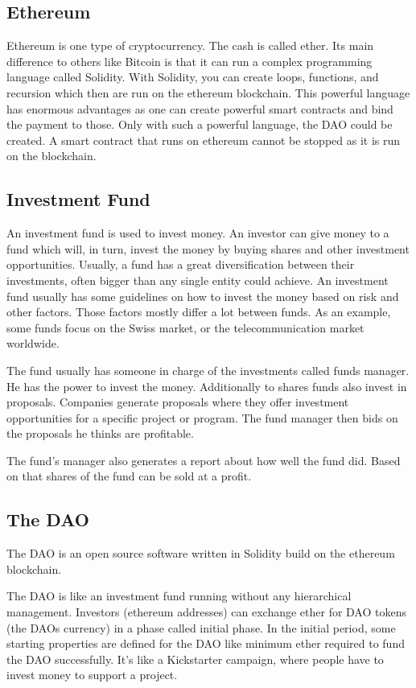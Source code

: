 \documentclass[a4paper, 11pt]{scrartcl}
\begin{document}
\subsection{Ethereum}

Ethereum is one type of cryptocurrency.
The cash is called ether.
Its main difference to others like Bitcoin is that it can run a complex programming language called Solidity.
With Solidity, you can create loops, functions, and recursion which then are run on the ethereum blockchain. 
This powerful language has enormous advantages as one can create powerful smart contracts and bind the payment to those.
Only with such a powerful language, the DAO could be created. 
A smart contract that runs on ethereum cannot be stopped as it is run on the blockchain. \cite{eth}

\subsection{Investment Fund}

An investment fund is used to invest money. An investor can give money to a fund which will, in turn, invest the money by buying shares and other investment opportunities. Usually, a fund has a great diversification between their investments, often bigger than any single entity could achieve. An investment fund usually has some guidelines on how to invest the money based on risk and other factors. Those factors mostly differ a lot between funds. As an example, some funds focus on the Swiss market, or the telecommunication market worldwide. \cite{fund}

The fund usually has someone in charge of the investments called funds manager. He has the power to invest the money. Additionally to shares funds also invest in proposals. Companies generate proposals where they offer investment opportunities for a specific project or program. The fund manager then bids on the proposals he thinks are profitable. \cite{proposal}

The fund's manager also generates a report about how well the fund did. Based on that shares of the fund can be sold at a profit. 

\subsection{The DAO}

The DAO is an open source software written in Solidity build on the ethereum blockchain.

The DAO is like an investment fund running without any hierarchical management.
Investors (ethereum addresses) can exchange ether for DAO tokens (the DAOs currency) in a phase called initial phase. In the initial period, some starting properties are defined for the DAO like minimum ether required to fund the DAO successfully. It's like a Kickstarter campaign, where people have to invest money to support a project.
\end{document}
